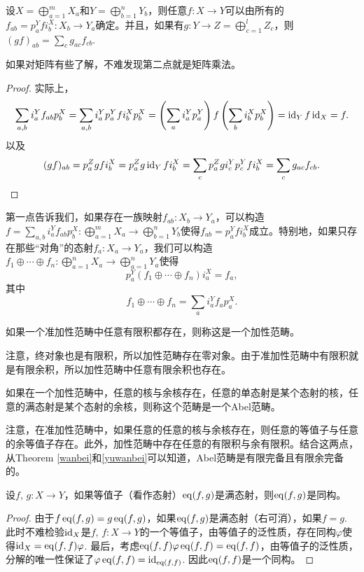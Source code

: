 \begin{pro}
设$X=\bigoplus_{a=1}^mX_a$和$Y=\bigoplus_{b=1}^nY_b$，则任意$f:X\to Y$可以由所有的$f_{ab}=p^Y_afi^X_b:X_b\to Y_a$确定。并且，如果有$g:Y\to Z=\bigoplus_{c=1}^lZ_c$，则$(gf)_{ab}=\sum_{c}g_{ac}f_{cb}$.
\end{pro}

如果对矩阵有些了解，不难发现第二点就是矩阵乘法。

\begin{proof}
实际上，
\[
	\sum_{a,b}i^Y_af_{ab}p^X_b=\sum_{a,b}i^Y_ap^Y_afi^X_bp^X_b=\left(\sum_ai^Y_ap^Y_a\right) f\left(\sum_bi^X_bp^X_b\right)=\operatorname{id}_{Y}f\operatorname{id}_{X}=f.
\]
以及
\[
	(gf)_{ab}=p^Z_agfi^X_b=p^Z_ag\operatorname{id}_Y fi^X_b=\sum_c p^Z_ag i^Y_cp^Y_c fi^X_b=\sum_{c}g_{ac}f_{cb}.
\]
\end{proof}

第一点告诉我们，如果存在一族映射$f_{ab}:X_b\to Y_a$，可以构造$f=\sum_{a,b}i^Y_af_{ab}p^X_b:\bigoplus_{a=1}^mX_a\to \bigoplus_{b=1}^nY_b$使得$f_{ab}=p^Y_afi^X_b$成立。特别地，如果只存在那些“对角”的态射$f_a:X_a\to Y_a$，我们可以构造$f_1\oplus \cdots \oplus f_n:\bigoplus_{a=1}^nX_a\to \bigoplus_{a=1}^nY_a$使得
\[
	p^Y_a(f_1\oplus \cdots \oplus f_n)i^X_a=f_a,
\]
其中
\[
	f_1\oplus \cdots \oplus f_n=\sum_{a}i^Y_af_{a}p^X_a.
\]

\begin{para}
如果一个准加性范畴中任意有限积都存在，则称这是一个加性范畴。
\end{para}

注意，终对象也是有限积，所以加性范畴存在零对象。由于准加性范畴中有限积就是有限余积，所以加性范畴中任意有限余积也存在。

\begin{para}
如果在一个加性范畴中，任意的核与余核存在，任意的单态射是某个态射的核，任意的满态射是某个态射的余核，则称这个范畴是一个Abel范畴。
\end{para}

注意，在准加性范畴中，如果任意的任意的核与余核存在，则任意的等值子与任意的余等值子存在。此外，加性范畴中存在任意的有限积与余有限积。结合这两点，从Theorem \ref{wanbei}和\ref{yuwanbei}可以知道，Abel范畴是有限完备且有限余完备的。

\begin{lem}
设$f$, $g:X\to Y$，如果等值子（看作态射）$\operatorname{eq}(f,g)$是满态射，则$\operatorname{eq}(f,g)$是同构。
\end{lem}

\begin{proof}
由于$f\operatorname{eq}(f,g)=g\operatorname{eq}(f,g)$，如果$\operatorname{eq}(f,g)$是满态射（右可消），如果$f=g$. 此时不难检验$\operatorname{id}_X$是$f$, $f:X\to Y$的一个等值子，由等值子的泛性质，存在同构$\varphi$使得$\operatorname{id}_X=\operatorname{eq}(f,f)\varphi$. 最后，考虑$\operatorname{eq}(f,f)\varphi\operatorname{eq}(f,f)=\operatorname{eq}(f,f)$，由等值子的泛性质，分解的唯一性保证了$\varphi\operatorname{eq}(f,f)=\operatorname{id}_{\operatorname{eq}(f,f)}$. 因此$\operatorname{eq}(f,f)$是一个同构。
\end{proof}

